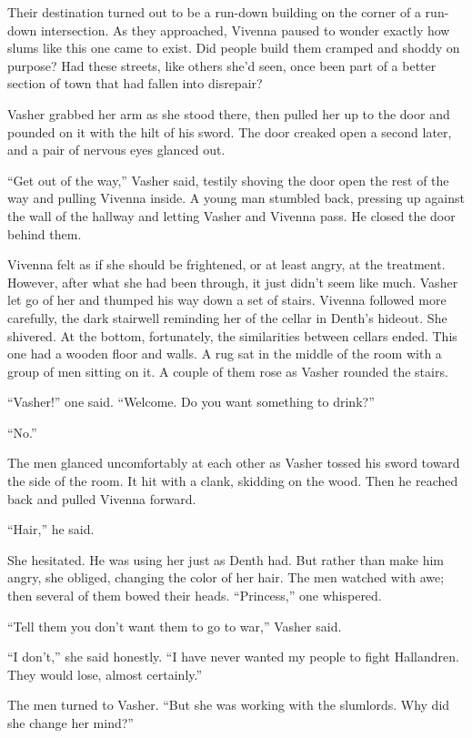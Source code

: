Their destination turned out to be a run-down building on the corner of a run-down intersection. As they approached, Vivenna paused to wonder exactly how slums like this one came to exist. Did people build them cramped and shoddy on purpose? Had these streets, like others she’d seen, once been part of a better section of town that had fallen into disrepair?

Vasher grabbed her arm as she stood there, then pulled her up to the door and pounded on it with the hilt of his sword. The door creaked open a second later, and a pair of nervous eyes glanced out.

“Get out of the way,” Vasher said, testily shoving the door open the rest of the way and pulling Vivenna inside. A young man stumbled back, pressing up against the wall of the hallway and letting Vasher and Vivenna pass. He closed the door behind them.

Vivenna felt as if she should be frightened, or at least angry, at the treatment. However, after what she had been through, it just didn’t seem like much. Vasher let go of her and thumped his way down a set of stairs. Vivenna followed more carefully, the dark stairwell reminding her of the cellar in Denth’s hideout. She shivered. At the bottom, fortunately, the similarities between cellars ended. This one had a wooden floor and walls. A rug sat in the middle of the room with a group of men sitting on it. A couple of them rose as Vasher rounded the stairs.

“Vasher!” one said. “Welcome. Do you want something to drink?”

“No.”

The men glanced uncomfortably at each other as Vasher tossed his sword toward the side of the room. It hit with a clank, skidding on the wood. Then he reached back and pulled Vivenna forward.

“Hair,” he said.

She hesitated. He was using her just as Denth had. But rather than make him angry, she obliged, changing the color of her hair. The men watched with awe; then several of them bowed their heads. “Princess,” one whispered.

“Tell them you don’t want them to go to war,” Vasher said.

“I don’t,” she said honestly. “I have never wanted my people to fight Hallandren. They would lose, almost certainly.”

The men turned to Vasher. “But she was working with the slumlords. Why did she change her mind?”

